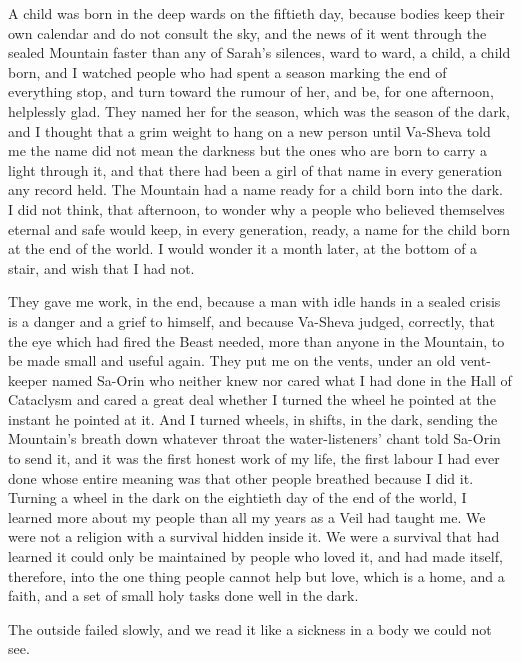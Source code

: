 A child was born in the deep wards on the fiftieth day, because bodies keep their own calendar and do not consult the sky, and the news of it went through the sealed Mountain faster than any of Sarah's silences, ward to ward, a child, a child born, and I watched people who had spent a season marking the end of everything stop, and turn toward the rumour of her, and be, for one afternoon, helplessly glad. They named her for the season, which was the season of the dark, and I thought that a grim weight to hang on a new person until Va-Sheva told me the name did not mean the darkness but the ones who are born to carry a light through it, and that there had been a girl of that name in every generation any record held. The Mountain had a name ready for a child born into the dark. I did not think, that afternoon, to wonder why a people who believed themselves eternal and safe would keep, in every generation, ready, a name for the child born at the end of the world. I would wonder it a month later, at the bottom of a stair, and wish that I had not.\par

They gave me work, in the end, because a man with idle hands in a sealed crisis is a danger and a grief to himself, and because Va-Sheva judged, correctly, that the eye which had fired the Beast needed, more than anyone in the Mountain, to be made small and useful again. They put me on the vents, under an old vent-keeper named Sa-Orin who neither knew nor cared what I had done in the Hall of Cataclysm and cared a great deal whether I turned the wheel he pointed at the instant he pointed at it. And I turned wheels, in shifts, in the dark, sending the Mountain's breath down whatever throat the water-listeners' chant told Sa-Orin to send it, and it was the first honest work of my life, the first labour I had ever done whose entire meaning was that other people breathed because I did it. Turning a wheel in the dark on the eightieth day of the end of the world, I learned more about my people than all my years as a Veil had taught me. We were not a religion with a survival hidden inside it. We were a survival that had learned it could only be maintained by people who loved it, and had made itself, therefore, into the one thing people cannot help but love, which is a home, and a faith, and a set of small holy tasks done well in the dark.\par

\ornament

The outside failed slowly, and we read it like a sickness in a body we could not see.\par

